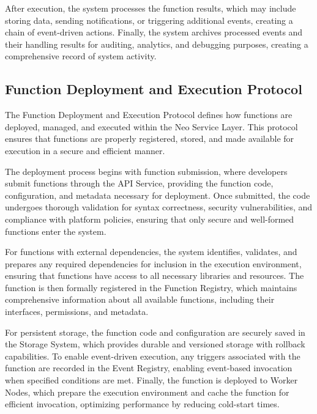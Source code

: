 \documentclass[12pt,a4paper]{article}
\begin{document}
After execution, the system processes the function results, which may include storing data, sending notifications, or triggering additional events, creating a chain of event-driven actions. Finally, the system archives processed events and their handling results for auditing, analytics, and debugging purposes, creating a comprehensive record of system activity.

\subsection{Function Deployment and Execution Protocol}
\label{subsec:function-protocol-spec}

The Function Deployment and Execution Protocol defines how functions are deployed, managed, and executed within the Neo Service Layer. This protocol ensures that functions are properly registered, stored, and made available for execution in a secure and efficient manner.



The deployment process begins with function submission, where developers submit functions through the API Service, providing the function code, configuration, and metadata necessary for deployment. Once submitted, the code undergoes thorough validation for syntax correctness, security vulnerabilities, and compliance with platform policies, ensuring that only secure and well-formed functions enter the system.

For functions with external dependencies, the system identifies, validates, and prepares any required dependencies for inclusion in the execution environment, ensuring that functions have access to all necessary libraries and resources. The function is then formally registered in the Function Registry, which maintains comprehensive information about all available functions, including their interfaces, permissions, and metadata.

For persistent storage, the function code and configuration are securely saved in the Storage System, which provides durable and versioned storage with rollback capabilities. To enable event-driven execution, any triggers associated with the function are recorded in the Event Registry, enabling event-based invocation when specified conditions are met. Finally, the function is deployed to Worker Nodes, which prepare the execution environment and cache the function for efficient invocation, optimizing performance by reducing cold-start times.
\end{document}
